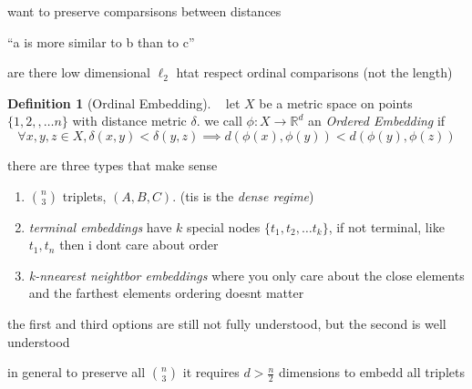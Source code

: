 \documentclass{article}
\theoremstyle{definition}
\newtheorem{definition}{Definition}
\begin{document}
want to preserve comparsisons between distances

``a is more similar to b than to c''

are there low dimensional \(\ell _2\) htat respect ordinal comparisons (not the length)

\begin{definition}[Ordinal Embedding]
    ~\newline
    let \(X\) be a metric space on points 
    \(\{1,2,,\dots n\}\) with distance metric \(\delta\). we call \(\phi: X\to \mathbb R^d\) an \emph{Ordered Embedding} if 
    \begin{equation}
        \forall x,y,z\in X, \delta(x,y)<\delta(y,z)\implies d(\phi(x),\phi(y))<d(\phi(y),\phi(z))
    \end{equation}
\end{definition}

there are three types that make sense

\begin{enumerate}
    \item \(n\choose 3\) triplets, \((A,B,C)\). (tis is the \emph{dense regime})
    \item \emph{terminal embeddings} have \(k\) special nodes \(\{t_1,t_2,\dots t_k\}\), if not terminal, like \(t_1, t_n\) then i dont care about order
    \item \emph{k-nnearest neightbor embeddings} where you only care about the close elements and the farthest elements ordering doesnt matter
\end{enumerate}


the first and third options are still not fully understood, but the second is well understood

in general to preserve all \(n\choose 3\) it requires \(d>\frac{n}{2}\) dimensions to embedd all triplets
\end{document}
